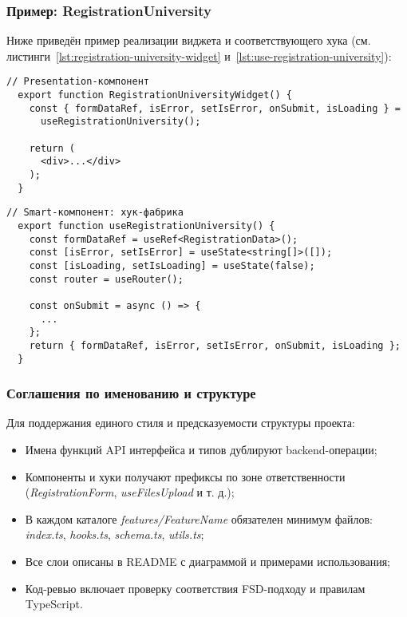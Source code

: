 \subsubsection{Пример: RegistrationUniversity}

Ниже приведён пример реализации виджета и соответствующего хука (см. листинги~\ref{lst:registration-university-widget} и~\ref{lst:use-registration-university}):

\begin{lstlisting}[breaklines=true,caption=RegistrationUniversityWidget,label=lst:registration-university-widget]
  // Presentation-компонент
  export function RegistrationUniversityWidget() {
    const { formDataRef, isError, setIsError, onSubmit, isLoading } =
      useRegistrationUniversity();

    return (
      <div>...</div>
    );
  }
\end{lstlisting}

\begin{lstlisting}[breaklines=true,caption=useRegistrationUniversity,label=lst:use-registration-university]
  // Smart-компонент: хук-фабрика
  export function useRegistrationUniversity() {
    const formDataRef = useRef<RegistrationData>();
    const [isError, setIsError] = useState<string[]>([]);
    const [isLoading, setIsLoading] = useState(false);
    const router = useRouter();

    const onSubmit = async () => {
      ...
    };
    return { formDataRef, isError, setIsError, onSubmit, isLoading };
  }
\end{lstlisting}

\subsubsection{Соглашения по именованию и структуре}

Для поддержания единого стиля и предсказуемости структуры проекта:
\begin{itemize}
  \item Имена функций API интерфейса и типов дублируют backend-операции;
  \item Компоненты и хуки получают префиксы по зоне ответственности (\textit{RegistrationForm}, \textit{useFilesUpload} и т. д.);
  \item В каждом каталоге \textit{features/FeatureName} обязателен минимум файлов: \textit{index.ts}, \textit{hooks.ts}, \textit{schema.ts}, \textit{utils.ts};
  \item Все слои описаны в README с диаграммой и примерами использования;
  \item Код-ревью включает проверку соответствия FSD-подходу и правилам TypeScript.
\end{itemize}
